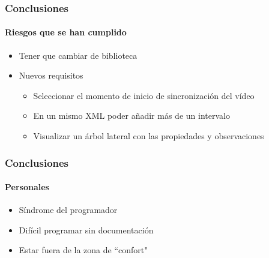 \begin{frame}
	\frametitle{Conclusiones}
	\framesubtitle{Riesgos que se han cumplido}
	\begin{itemize}
		\item Tener que cambiar de biblioteca
		\item Nuevos requisitos
		\begin{itemize}
			\item Seleccionar el momento de inicio de sincronizaci\'on del 
			v\'ideo
			\item En un mismo XML poder a\~nadir m\'as de un intervalo
			\item Visualizar un \'arbol lateral con las propiedades y 
			observaciones
		\end{itemize}
	\end{itemize}
\end{frame}

\begin{frame}
	\frametitle{Conclusiones}
	\framesubtitle{Personales}
	
	\begin{itemize}
		\item S\'indrome del programador
		\item Dif\'icil programar sin documentaci\'on
		\item Estar fuera de la zona de ``confort"
	\end{itemize}
\end{frame}

